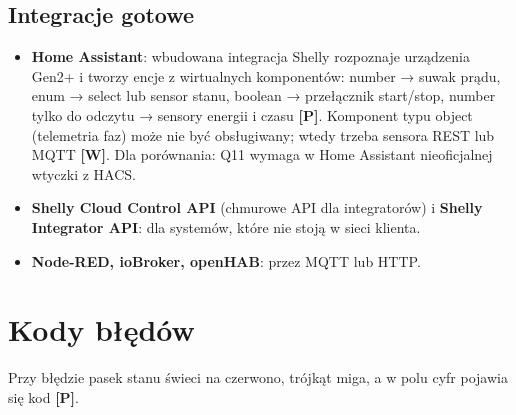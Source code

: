 \documentclass[11pt,a4paper]{article}
\newcommand{\tagP}{\textcolor{apgreen}{\textbf{[P]}}}
\newcommand{\tagW}{\textcolor{apamber}{\textbf{[W]}}}
\begin{document}
\subsection{Integracje gotowe}

\begin{itemize}
\item \textbf{Home Assistant}: wbudowana integracja Shelly rozpoznaje urządzenia Gen2+ i tworzy encje z wirtualnych komponentów: number → suwak prądu, enum → select lub sensor stanu, boolean → przełącznik start/stop, number tylko do odczytu → sensory energii i czasu \tagP. Komponent typu object (telemetria faz) może nie być obsługiwany; wtedy trzeba sensora REST lub MQTT \tagW. Dla porównania: Q11 wymaga w Home Assistant nieoficjalnej wtyczki z HACS.
\item \textbf{Shelly Cloud Control API} (chmurowe API dla integratorów) i \textbf{Shelly Integrator API}: dla systemów, które nie stoją w sieci klienta.
\item \textbf{Node-RED, ioBroker, openHAB}: przez MQTT lub HTTP.
\end{itemize}

\section{Kody błędów}
\label{sec:bledy}

Przy błędzie pasek stanu świeci na czerwono, trójkąt miga, a w polu cyfr pojawia się kod \tagP.
\end{document}
